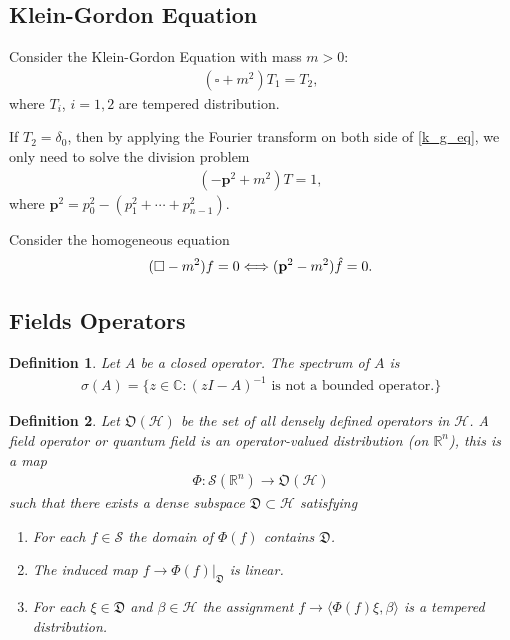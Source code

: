 \documentclass[a4paper,10pt]{amsart}
\newtheorem{definition}{Definition}[section]
\newcommand{\HHH}{\mathcal H} %
\newcommand{\SSS}{\mathcal S}
\newcommand{\DDD}{\mathfrak D}
\newcommand{\C}{\mathbb C} %
\newcommand{\R}{\mathbb R}  %
\begin{document}
\subsection{Klein-Gordon Equation}

Consider the Klein-Gordon Equation with mass $m > 0$:
\begin{align} \label{k_g_eq}
    (\square + m^2)T_1 = T_2, 
\end{align}
where $T_i$, $i = 1, 2$ are tempered distribution.

If $T_2 = \delta_0$, then by applying the Fourier transform on both side
of \cref{k_g_eq}, we only need to solve the division problem
\begin{align*}
    (-\mathbf{p}^2 + m^2)T = 1, 
\end{align*}
where $\mathbf{p}^2 = p_{0}^{2} - (p_{1}^{2} + \cdots + p_{n-1}^{2})$. 

Consider the homogeneous equation
\begin{align*}
    (\square - m^2)f = 0 \Longleftrightarrow 
    (\mathbf{p}^{2} - m^2)\Hat{f} = 0. 
\end{align*}


\subsection{Fields Operators}

\begin{definition}
    Let $A$ be a closed operator. The spectrum of $A$ is 
    \begin{align*}
        \sigma(A) = \{z \in \C : (zI - A)^{-1} \mbox{ is not a bounded
        operator.} \}
    \end{align*}
\end{definition}

\begin{definition}
   Let $\mathfrak{O}(\HHH)$ be the set of all densely defined 
   operators in $\HHH$. 
   A field operator or quantum field is an operator-valued distribution
   (on $\R^{n}$), this is a map
   \begin{align*}
       \Phi: \SSS(\R^{n}) \to \mathfrak{O}(\HHH)
   \end{align*}
   such that there exists a dense subspace $\DDD \subset \HHH$ satisfying
   \begin{enumerate}
       \item For each $f \in \SSS$ the domain of $\Phi(f)$ contains $\DDD$.
       \item The induced map $f \to \Phi(f)|_{\DDD}$ is linear.
       \item For each $\xi \in \DDD$ and $\beta \in \HHH$ the 
           assignment $f \to \langle \Phi(f)\xi, \beta \rangle$ is a
           tempered distribution.
   \end{enumerate}
\end{definition}
\end{document}
